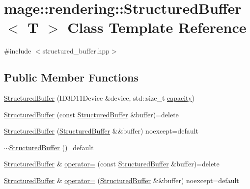 \hypertarget{classmage_1_1rendering_1_1_structured_buffer}{}\section{mage\+:\+:rendering\+:\+:Structured\+Buffer$<$ T $>$ Class Template Reference}
\label{classmage_1_1rendering_1_1_structured_buffer}


{\ttfamily \#include $<$structured\+\_\+buffer.\+hpp$>$}

\subsection*{Public Member Functions}
\begin{DoxyCompactItemize}
\item 
\mbox{\hyperlink{classmage_1_1rendering_1_1_structured_buffer_a2abc009cf0cca2add8bb2b19ec2f89d1}{Structured\+Buffer}} (I\+D3\+D11\+Device \&device, std\+::size\+\_\+t \mbox{\hyperlink{classmage_1_1rendering_1_1_structured_buffer_a3ae2af55804a94eefa6b697d6eec1998}{capacity}})
\item 
\mbox{\hyperlink{classmage_1_1rendering_1_1_structured_buffer_a7b36af7d270cf05865e498d0d2e0ca5e}{Structured\+Buffer}} (const \mbox{\hyperlink{classmage_1_1rendering_1_1_structured_buffer}{Structured\+Buffer}} \&buffer)=delete
\item 
\mbox{\hyperlink{classmage_1_1rendering_1_1_structured_buffer_a61c5c9f1a734f9c791a56c1c4819588e}{Structured\+Buffer}} (\mbox{\hyperlink{classmage_1_1rendering_1_1_structured_buffer}{Structured\+Buffer}} \&\&buffer) noexcept=default
\item 
\mbox{\hyperlink{classmage_1_1rendering_1_1_structured_buffer_abedc0f11782f0a321341a501267bb546}{$\sim$\+Structured\+Buffer}} ()=default
\item 
\mbox{\hyperlink{classmage_1_1rendering_1_1_structured_buffer}{Structured\+Buffer}} \& \mbox{\hyperlink{classmage_1_1rendering_1_1_structured_buffer_a646a5540b88c4a4262b4c6649934c368}{operator=}} (const \mbox{\hyperlink{classmage_1_1rendering_1_1_structured_buffer}{Structured\+Buffer}} \&buffer)=delete
\item 
\mbox{\hyperlink{classmage_1_1rendering_1_1_structured_buffer}{Structured\+Buffer}} \& \mbox{\hyperlink{classmage_1_1rendering_1_1_structured_buffer_ad5ac95b375a2ca537abd61706746bb58}{operator=}} (\mbox{\hyperlink{classmage_1_1rendering_1_1_structured_buffer}{Structured\+Buffer}} \&\&buffer) noexcept=default

\end{DoxyCompactItemize}
